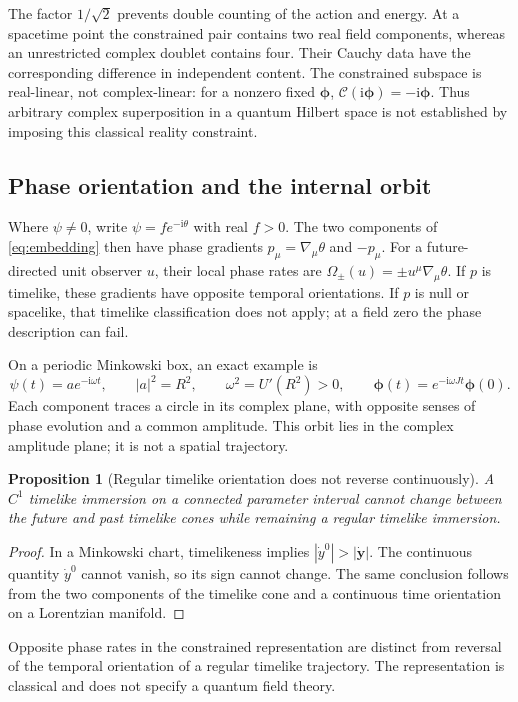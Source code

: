 \documentclass[aip,adv,reprint,onecolumn,amsmath,amssymb]{revtex4-2}
\newcommand{\ii}{\mathrm i}
\newcommand{\Ph}{\boldsymbol\phi}
\newtheorem{proposition}[theorem]{Proposition}
\begin{document}
The factor $1/\sqrt2$ prevents double counting of the action and energy. At a spacetime point the constrained pair contains two real field components, whereas an unrestricted complex doublet contains four. Their Cauchy data have the corresponding difference in independent content. The constrained subspace is real-linear, not complex-linear: for a nonzero fixed $\Ph$, $\mathcal C(\ii\Ph)=-\ii\Ph$. Thus arbitrary complex superposition in a quantum Hilbert space is not established by imposing this classical reality constraint.

\subsection{Phase orientation and the internal orbit}
Where $\psi\ne0$, write $\psi=f e^{-\ii\theta}$ with real $f>0$. The two components of \eqref{eq:embedding} then have phase gradients $p_\mu=\nabla_\mu\theta$ and $-p_\mu$. For a future-directed unit observer $u$, their local phase rates are $\Omega_\pm(u)=\pm u^\mu\nabla_\mu\theta$. If $p$ is timelike, these gradients have opposite temporal orientations. If $p$ is null or spacelike, that timelike classification does not apply; at a field zero the phase description can fail.

On a periodic Minkowski box, an exact example is
\begin{equation}
 \psi(t)=a e^{-\ii\omega t},\qquad |a|^2=R^2,\qquad \omega^2=U'(R^2)>0,
 \qquad \Ph(t)=e^{-\ii\omega Jt}\Ph(0).
 \label{eq:orbit}
\end{equation}
Each component traces a circle in its complex plane, with opposite senses of phase evolution and a common amplitude. This orbit lies in the complex amplitude plane; it is not a spatial trajectory.

\begin{proposition}[Regular timelike orientation does not reverse continuously]
A $C^1$ timelike immersion on a connected parameter interval cannot change between the future and past timelike cones while remaining a regular timelike immersion.
\end{proposition}
\begin{proof}
In a Minkowski chart, timelikeness implies $|\dot y^0|>|\dot{\bm y}|$. The continuous quantity $\dot y^0$ cannot vanish, so its sign cannot change. The same conclusion follows from the two components of the timelike cone and a continuous time orientation on a Lorentzian manifold.
\end{proof}
Opposite phase rates in the constrained representation are distinct from reversal of the temporal orientation of a regular timelike trajectory. The representation is classical and does not specify a quantum field theory.
\end{document}
